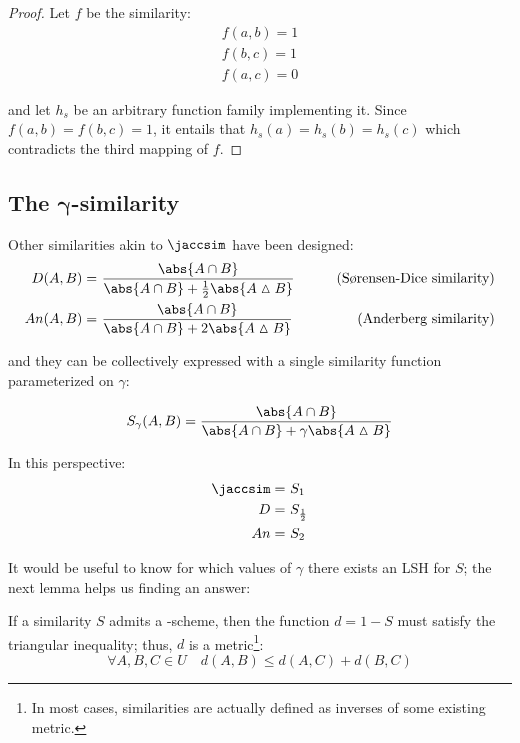 \begin{proof}
    Let $f$ be the similarity:
    \begin{align*}
        f(a, b) = 1 \\
        f(b, c) = 1 \\
        f(a, c) = 0
    \end{align*}

    and let $h_s$ be an arbitrary function family implementing it. Since $f(a, b) = f(b, c) = 1$, it entails that $h_s(a) = h_s(b) = h_s(c)$ which contradicts the third mapping of $f$.
\end{proof}


\subsection[\texorpdfstring{The $\gamma$-similarity}{The gamma-similarity}]{The $\bm\gamma$-similarity}

Other similarities akin to $\jaccsim$ have been designed:
\begin{align*}
    D(A, B)  =&\ \frac{\abs{A \cap B}}{\abs{A \cap B} + \frac{1}{2} \abs{A \vartriangle B}} & \tag{S\o{}rensen-Dice similarity} \\
    An(A, B) =&\ \frac{\abs{A \cap B}}{\abs{A \cap B} + 2 \abs{A \vartriangle B}}           & \tag{Anderberg similarity}
\end{align*}

and they can be collectively expressed with a single similarity function parameterized on $\gamma$:

\begin{definition}
    \begin{equation}
    \displaystyle S_\gamma(A, B) = \frac{\abs{A \cap B}}{\abs{A \cap B} + \gamma \abs{A \vartriangle B}}
    \end{equation}
\end{definition}

In this perspective:
\begin{align*}
    \jaccsim =&\ S_1 \\
    D        =&\ S_\frac{1}{2} \\
    An       =&\ S_2
\end{align*}

It would be useful to know for which values of $\gamma$ there exists an LSH for $S$; the next lemma helps us finding an answer:

\begin{lemma}[Charikar] \label{lem:charikar}
    If a similarity $S$ admits a \lsh-scheme, then the function $d = 1 - S$ must satisfy the triangular inequality; thus, $d$ is a metric\footnote{In most cases, similarities are actually defined as inverses of some existing metric.}:
    \[
        \forall A, B, C \in U \quad d(A, B) \leq d(A, C) + d(B, C)
    \]
\end{lemma}

